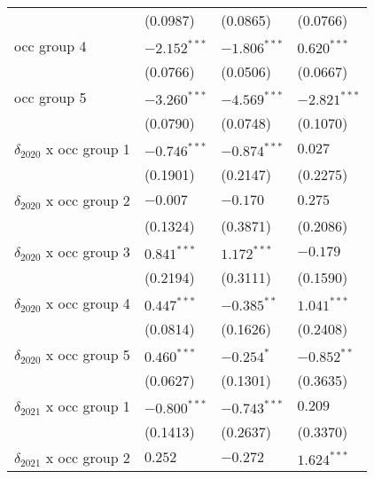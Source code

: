 \begin{tabular}{llll}
                                       &           (0.0987) &           (0.0865) &           (0.0766) \\
occ group 4                            &     $-2.152^{***}$ &     $-1.806^{***}$ &      $0.620^{***}$ \\
                                       &           (0.0766) &           (0.0506) &           (0.0667) \\
occ group 5                            &     $-3.260^{***}$ &     $-4.569^{***}$ &     $-2.821^{***}$ \\
                                       &           (0.0790) &           (0.0748) &           (0.1070) \\
$\delta_{2020}$ x occ group 1          &     $-0.746^{***}$ &     $-0.874^{***}$ &            $0.027$ \\
                                       &           (0.1901) &           (0.2147) &           (0.2275) \\
$\delta_{2020}$ x occ group 2          &           $-0.007$ &           $-0.170$ &            $0.275$ \\
                                       &           (0.1324) &           (0.3871) &           (0.2086) \\
$\delta_{2020}$ x occ group 3          &      $0.841^{***}$ &      $1.172^{***}$ &           $-0.179$ \\
                                       &           (0.2194) &           (0.3111) &           (0.1590) \\
$\delta_{2020}$ x occ group 4          &      $0.447^{***}$ &      $-0.385^{**}$ &      $1.041^{***}$ \\
                                       &           (0.0814) &           (0.1626) &           (0.2408) \\
$\delta_{2020}$ x occ group 5          &      $0.460^{***}$ &         $-0.254^*$ &      $-0.852^{**}$ \\
                                       &           (0.0627) &           (0.1301) &           (0.3635) \\
$\delta_{2021}$ x occ group 1          &     $-0.800^{***}$ &     $-0.743^{***}$ &            $0.209$ \\
                                       &           (0.1413) &           (0.2637) &           (0.3370) \\
$\delta_{2021}$ x occ group 2          &            $0.252$ &           $-0.272$ &      $1.624^{***}$ \\

\end{tabular}
